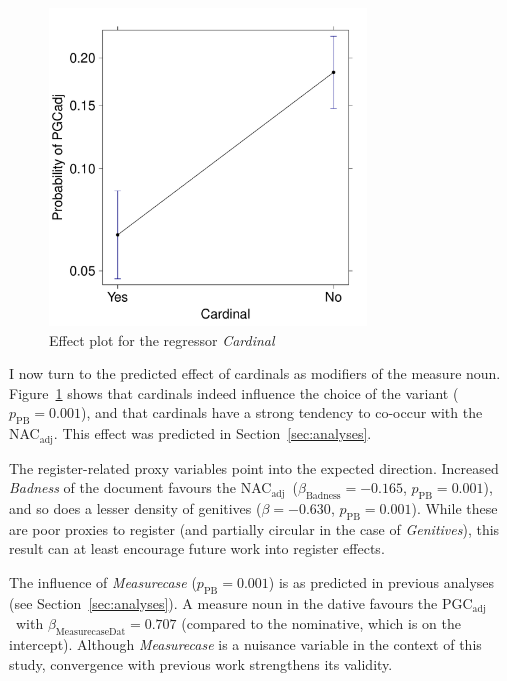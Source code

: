 \documentclass[USenglish]{article}
\newcommand{\Sub}[1]{\ensuremath{\mathrm{_{#1}}}}
\newcommand{\mpPB}{\ensuremath{p_{\text{PB}}}}
\newcommand{\NACa}{NAC\Sub{adj}}
\newcommand{\PGCa}{PGC\Sub{adj}}
\begin{document}

\begin{figure}[h!]
  \centering
  \includegraphics[width=0.75\textwidth]{../R/output/corpus_Cardinal}
  \caption{Effect plot for the regressor \textit{Cardinal}}
  \label{fig:eff:leftcontext}
\end{figure}

I now turn to the predicted effect of cardinals as modifiers of the measure noun.
Figure~\ref{fig:eff:leftcontext} shows that cardinals indeed influence the choice of the variant ($\mpPB=0.001$), and that cardinals have a strong tendency to co-occur with the \NACa.
This effect was predicted in Section~\ref{sec:analyses}.


The register-related proxy variables point into the expected direction.
Increased \textit{Badness} of the document favours the \NACa\ ($\beta_{\text{Badness}}=-0.165$, $\mpPB=0.001$), and so does a lesser density of genitives ($\beta=-0.630$, $\mpPB=0.001$).
While these are poor proxies to register (and partially circular in the case of \textit{Genitives}), this result can at least encourage future work into register effects. 


The influence of \textit{Measurecase} ($\mpPB=0.001$) is as predicted in previous analyses (see Section~\ref{sec:analyses}).
A measure noun in the dative favours the \PGCa\ with $\beta_{\text{MeasurecaseDat}}=0.707$ (compared to the nominative, which is on the intercept).
Although \textit{Measurecase} is a nuisance variable in the context of this study, convergence with previous work strengthens its validity.
\end{document}
